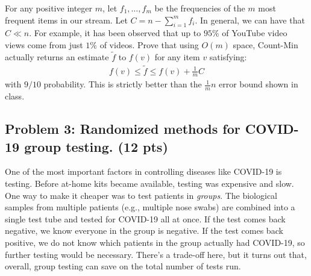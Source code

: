 \documentclass[10pt]{article}
\begin{document}
For any positive integer $m$, let $f_1, \ldots, f_{m}$ be the frequencies of the $m$ most frequent items in our stream. Let $C = n - \sum_{i=1}^{m} f_i$. In general, we can have that $C \ll n$. For example, it has been observed that up to $95\%$ of YouTube video views come from just $1\%$ of videos. 
Prove that using $O(m)$ space,  Count-Min actually returns an estimate $\tilde{f}$ to $f(v)$ for any item $v$ satisfying:
\begin{align*}
	f(v) \leq \tilde{f} \leq f(v) + \frac{1}{m} C
\end{align*}
with $9/10$ probability. This is strictly better than the $\frac{1}{m} n$ error bound shown in class. 


\subsection{Problem 3: Randomized methods for COVID-19 group testing. (12 pts)}
One of the most important factors in controlling diseases like COVID-19 is testing. Before at-home kits became available, testing was expensive and slow. One way to make it cheaper was to test patients in \emph{groups}. The biological samples from multiple patients (e.g., multiple nose swabs) are combined into a single test tube and tested for COVID-19 all at once. If the test comes back negative, we know everyone in the group is negative. If the test comes back positive, we do not know which patients in the group actually had COVID-19, so further testing would be necessary. There's a trade-off here, but it turns out that, overall, group testing can save on the total number of tests run. 
\end{document}
